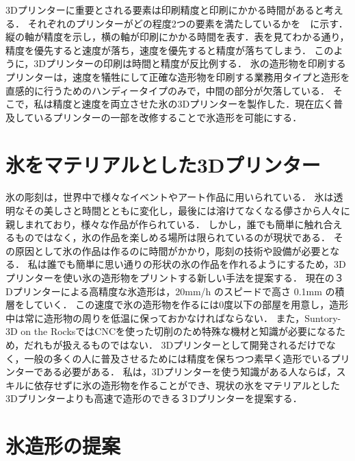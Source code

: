 3Dプリンターに重要とされる要素は印刷精度と印刷にかかる時間があると考える．
それぞれのプリンターがどの程度2つの要素を満たしているかを　に示す．
縦の軸が精度を示し，横の軸が印刷にかかる時間を表す．表を見てわかる通り，精度を優先すると速度が落ち，速度を優先すると精度が落ちてしまう．
このように，3Dプリンターの印刷は時間と精度が反比例する．
氷の造形物を印刷するプリンターは，速度を犠牲にして正確な造形物を印刷する業務用タイプと造形を直感的に行うためのハンディータイプのみで，中間の部分が欠落している．
そこで，私は精度と速度を両立させた氷の3Dプリンターを製作した．現在広く普及しているプリンターの一部を改修することで氷造形を可能にする．

\section{氷をマテリアルとした3Dプリンター}
\label{sec:paragraph2}

氷の彫刻は，世界中で様々なイベントやアート作品に用いられている．
氷は透明なその美しさと時間とともに変化し，最後には溶けてなくなる儚さから人々に親しまれており，様々な作品が作られている．
しかし，誰でも簡単に触れ合えるものではなく，氷の作品を楽しめる場所は限られているのが現状である．
その原因として氷の作品は作るのに時間がかかり，彫刻の技術や設備が必要となる．
私は誰でも簡単に思い通りの形状の氷の作品を作れるようにするため，3Dプリンターを使い氷の造形物をプリントする新しい手法を提案する．
現在の３Dプリンターによる高精度な氷造形は，20mm/h のスピードで高さ 0.1mm の積層をしていく．
この速度で氷の造形物を作るには0度以下の部屋を用意し，造形中は常に造形物の周りを低温に保っておかなければならない．
また，Suntory-3D on the RocksではCNCを使った切削のため特殊な機材と知識が必要になるため，だれもが扱えるものではない．
3Dプリンターとして開発されるだけでなく，一般の多くの人に普及させるためには精度を保ちつつ素早く造形でいるプリンターである必要がある．
私は，3Dプリンターを使う知識がある人ならば，スキルに依存せずに氷の造形物を作ることができ、現状の氷をマテリアルとした3Dプリンターよりも高速で造形のできる３Dプリンターを提案する．

\section{氷造形の提案}
\label{sec:enum3}

